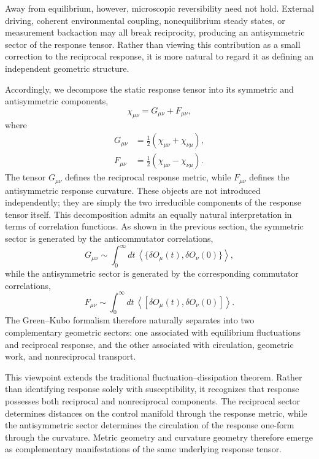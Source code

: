 Away from equilibrium, however, microscopic reversibility need
not hold. External driving, coherent environmental coupling,
nonequilibrium steady states, or measurement backaction may all
break reciprocity, producing an antisymmetric sector of the
response tensor. Rather than viewing this contribution as a small
correction to the reciprocal response, it is more natural to
regard it as defining an independent geometric structure.

Accordingly, we decompose the static response tensor into its
symmetric and antisymmetric components,
%
\begin{equation}
\chi_{\mu\nu}
=
G_{\mu\nu}
+
F_{\mu\nu},
\end{equation}
%
where
%
\begin{align}
G_{\mu\nu}
&=
\frac12
\left(
\chi_{\mu\nu}
+
\chi_{\nu\mu}
\right),
\\
F_{\mu\nu}
&=
\frac12
\left(
\chi_{\mu\nu}
-
\chi_{\nu\mu}
\right).
\end{align}
%
The tensor $G_{\mu\nu}$ defines the reciprocal response metric,
while $F_{\mu\nu}$ defines the antisymmetric response curvature.
These objects are not introduced independently; they are simply
the two irreducible components of the response tensor itself.
This decomposition admits an equally natural interpretation in
terms of correlation functions. As shown in the previous section,
the symmetric sector is generated by the anticommutator
correlations,
%
\begin{equation}
G_{\mu\nu}
\sim
\int_0^\infty
dt\,
\left\langle
\{
\delta O_\mu(t),
\delta O_\nu(0)
\}
\right\rangle,
\end{equation}
%
while the antisymmetric sector is generated by the corresponding
commutator correlations,
%
\begin{equation}
F_{\mu\nu}
\sim
\int_0^\infty
dt\,
\left\langle
[
\delta O_\mu(t),
\delta O_\nu(0)
]
\right\rangle.
\end{equation}
%
The Green--Kubo formalism therefore naturally separates into two
complementary geometric sectors: one associated with equilibrium
fluctuations and reciprocal response, and the other associated
with circulation, geometric work, and nonreciprocal transport.

This viewpoint extends the traditional fluctuation--dissipation
theorem. Rather than identifying response solely with
susceptibility, it recognizes that response possesses both
reciprocal and nonreciprocal components. The reciprocal sector
determines distances on the control manifold through the response
metric, while the antisymmetric sector determines the circulation
of the response one-form through the curvature. Metric geometry
and curvature geometry therefore emerge as complementary
manifestations of the same underlying response tensor.

